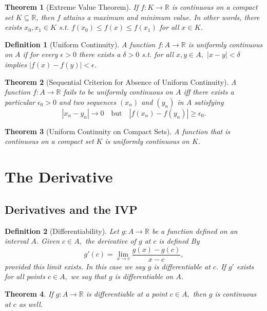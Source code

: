 \documentclass[10pt]{article}
\newtheorem{theorem}{Theorem}[section]
\newtheorem{definition}{Definition}[section]
\begin{document}
\begin{theorem}[Extreme Value Theorem]
    If $f:K\to\mathbb{R}$ is continuous on a compact set $K\subseteq\mathbb{R}$, then $f$ attains a maximum and minimum value. In other words, there exists $x_0, x_1\in K$ s.t. $f(x_0)\le f(x)\le f(x_1)$ for all $x\in K$.
\end{theorem}

\begin{definition}[Uniform Continuity]
    A function $f:A\to\mathbb{R}$ is uniformly continuous on $A$ if for every $\epsilon>0$ there exists a $\delta>0$ s.t. for all $x,y\in A,$ $|x-y|<\delta$ implies $|f(x)-f(y)|<\epsilon.$
\end{definition}

\begin{theorem}[Sequential Criterion  for Absence of Uniform Continuity]
    A function $f:A\to\mathbb{R}$ fails to be uniformly continuous on $A$ iff there exists a particular $\epsilon_0>0$ and two sequences $(x_n)$ and $(y_n)$ in $A$ satisfying
    \[|x_n-y_n|\to 0\quad\text{but}\quad |f(x_n)-f(y_n)|\ge\epsilon_0.\]
\end{theorem}

\begin{theorem}[Uniform Continuity on Compact Sets]
    A function that is continuous on a compact set $K$ is uniformly continuous on $K$.
\end{theorem}

\section{The Derivative}

\subsection{Derivatives and the IVP}

\begin{definition}[Differentiability]
    Let $g:A\to\mathbb{R}$ be a function defined on an interval $A$. Given $c\in A,$ the derivative of $g$ at $c$ is defined By
    \[g'(c)=\lim_{x\to c}\frac{g(x)-g(c)}{x-c},\]
    provided this limit exists. In this case we say $g$ is differentiable at $c$. If $g'$ exists for all points $c\in A,$ we say that $g$ is differentiable on $A$.
\end{definition}

\begin{theorem}
    If $g:A\to\mathbb{R}$ is differentiable at a point $c\in A,$ then $g$ is continuous at $c$ as well.
\end{theorem}
\end{document}
